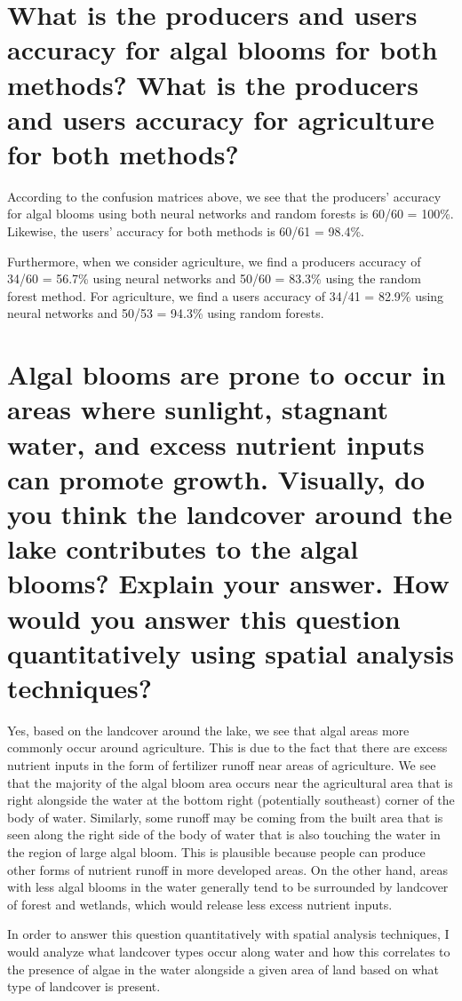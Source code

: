 \documentclass[11pt]{article}
\begin{document}
\section{What is the producers and users accuracy for algal blooms for both methods? What is the producers and users accuracy for agriculture for both methods?}

According to the confusion matrices above, we see that the producers' accuracy for algal blooms using both neural networks and random forests is 60/60 = 100\%. Likewise, the users' accuracy for both methods is 60/61 = 98.4\%.

Furthermore, when we consider agriculture, we find a producers accuracy of 34/60 = 56.7\% using neural networks and 50/60 = 83.3\% using the random forest method. For agriculture, we find a users accuracy of 34/41 = 82.9\% using neural networks and 50/53 = 94.3\% using random forests.

\section{Algal blooms are prone to occur in areas where sunlight, stagnant water, and excess nutrient inputs can promote growth. Visually, do you think the landcover around the lake contributes to the algal blooms? Explain your answer. How would you answer this question quantitatively using spatial analysis techniques?}

Yes, based on the landcover around the lake, we see that algal areas more commonly occur around agriculture. This is due to the fact that there are excess nutrient inputs in the form of fertilizer runoff near areas of agriculture. We see that the majority of the algal bloom area occurs near the agricultural area that is right alongside the water at the bottom right (potentially southeast) corner of the body of water. Similarly, some runoff may be coming from the built area that is seen along the right side of the body of water that is also touching the water in the region of large algal bloom. This is plausible because people can produce other forms of nutrient runoff in more developed areas. On the other hand, areas with less algal blooms in the water generally tend to be surrounded by landcover of forest and wetlands, which would release less excess nutrient inputs.

In order to answer this question quantitatively with spatial analysis techniques, I would analyze what landcover types occur along water and how this correlates to the presence of algae in the water alongside a given area of land based on what type of landcover is present.
\end{document}

